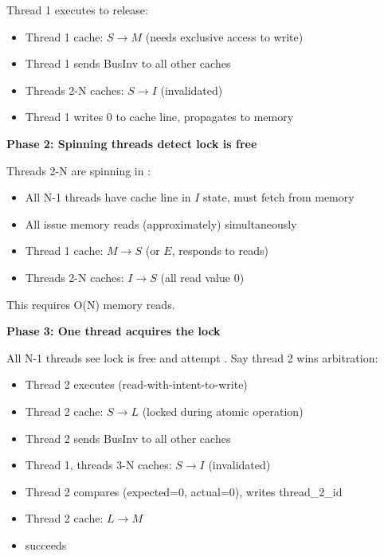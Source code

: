 \documentclass{article}
\newenvironment{answer}
{\color{blue}}
{\normalfont}
\begin{document}
\begin{enumerate}
\begin{enumerate}
\begin{answer}
                        Thread 1 executes  to release:
                        \begin{itemize}
                            \item Thread 1 cache: $S \to M$ (needs exclusive access to write)
                            \item Thread 1 sends BusInv to all other caches
                            \item Threads 2-N caches: $S \to I$ (invalidated)
                            \item Thread 1 writes 0 to cache line, propagates to memory
                        \end{itemize}

                        \textbf{Phase 2: Spinning threads detect lock is free}

                        Threads 2-N are spinning in :
                        \begin{itemize}
                            \item All N-1 threads have cache line in $I$ state, must fetch from memory
                            \item All issue memory reads (approximately) simultaneously
                            \item Thread 1 cache: $M \to S$ (or $E$, responds to reads)
                            \item Threads 2-N caches: $I \to S$ (all read value 0)
                        \end{itemize}
                        This requires O(N) memory reads.

                        \textbf{Phase 3: One thread acquires the lock}

                        All N-1 threads see lock is free and attempt . Say thread 2 wins arbitration:
                        \begin{itemize}
                            \item Thread 2 executes  (read-with-intent-to-write)
                            \item Thread 2 cache: $S \to L$ (locked during atomic operation)
                            \item Thread 2 sends BusInv to all other caches
                            \item Thread 1, threads 3-N caches: $S \to I$ (invalidated)
                            \item Thread 2 compares (expected=0, actual=0), writes thread\_2\_id
                            \item Thread 2 cache: $L \to M$
                            \item {} succeeds
                        \end{itemize}


\end{answer}
\end{enumerate}
\end{enumerate}
\end{document}
